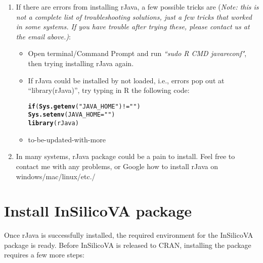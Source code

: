 \documentclass{article}\usepackage[]{graphicx}\usepackage[]{color}
\makeatletter
\newcommand{\hlstr}[1]{\textcolor[rgb]{0.192,0.494,0.8}{#1}}%
\newcommand{\hlopt}[1]{\textcolor[rgb]{0,0,0}{#1}}%
\newcommand{\hlstd}[1]{\textcolor[rgb]{0.345,0.345,0.345}{#1}}%
\newcommand{\hlkwa}[1]{\textcolor[rgb]{0.161,0.373,0.58}{\textbf{#1}}}%
\newcommand{\hlkwc}[1]{\textcolor[rgb]{0.333,0.667,0.333}{#1}}%
\newcommand{\hlkwd}[1]{\textcolor[rgb]{0.737,0.353,0.396}{\textbf{#1}}}%
\newenvironment{kframe}{%
 \def\at@end@of@kframe{}%
 \ifinner\ifhmode%
  \def\at@end@of@kframe{\end{minipage}}%
  \begin{minipage}{\columnwidth}%
 \fi\fi%
 \def\FrameCommand##1{\hskip\@totalleftmargin \hskip-\fboxsep
 \colorbox{shadecolor}{##1}\hskip-\fboxsep
     \hskip-\linewidth \hskip-\@totalleftmargin \hskip\columnwidth}%
 \MakeFramed {\advance\hsize-\width
   \@totalleftmargin\z@ \linewidth\hsize
   \@setminipage}}%
 {\par\unskip\endMakeFramed%
 \at@end@of@kframe}
\newenvironment{knitrout}{}{} %
\makeatother
\begin{document}
\begin{enumerate}
\begin{knitrout}
\begin{kframe}
\end{kframe}
\end{knitrout}
	\item If there are errors from installing rJava, a few possible tricks are (\textit{Note: this is not a complete list of troubleshooting solutions, just a few tricks that worked in some systems. If you have trouble after trying these, please contact us at the email above.)}:
		\begin{itemize}
			\item Open terminal/Command Prompt and run \textit{``sudo R CMD javareconf"}, then trying installing rJava again.
			\item If rJava could be installed by not loaded, i.e., errors pop out at ``library(rJava)'', try typing in R the following code:
\begin{knitrout}
\color{fgcolor}\begin{kframe}
\begin{alltt}
\hlkwa{if} \hlstd{(}\hlkwd{Sys.getenv}\hlstd{(}\hlstr{"JAVA_HOME"}\hlstd{)}\hlopt{!=}\hlstr{""}\hlstd{)}
\hlkwd{Sys.setenv}\hlstd{(}\hlkwc{JAVA_HOME}\hlstd{=}\hlstr{""}\hlstd{)}
\hlkwd{library}\hlstd{(rJava)}
\end{alltt}
\end{kframe}
\end{knitrout}

			\item to-be-updated-with-more
		\end{itemize}	
	\item In many systems, rJava package could be a pain to install. Feel free to contact me with any problems, or Google how to install rJava on windows/mac/linux/etc./	
 \end{enumerate} 

\section{Install InSilicoVA package}
Once rJava is successfully installed, the required environment for the InSilicoVA package is ready. Before InSilicoVA is released to CRAN, installing the package requires a few more steps:
\end{document}

